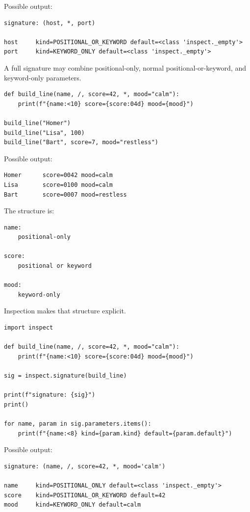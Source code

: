 Possible output:

\begin{verbatim}
signature: (host, *, port)

host     kind=POSITIONAL_OR_KEYWORD default=<class 'inspect._empty'>
port     kind=KEYWORD_ONLY default=<class 'inspect._empty'>
\end{verbatim}

A full signature may combine positional-only, normal positional-or-keyword, and keyword-only parameters.

\begin{verbatim}
def build_line(name, /, score=42, *, mood="calm"):
    print(f"{name:<10} score={score:04d} mood={mood}")

build_line("Homer")
build_line("Lisa", 100)
build_line("Bart", score=7, mood="restless")
\end{verbatim}

Possible output:

\begin{verbatim}
Homer      score=0042 mood=calm
Lisa       score=0100 mood=calm
Bart       score=0007 mood=restless
\end{verbatim}

The structure is:

\begin{verbatim}
name:
    positional-only

score:
    positional or keyword

mood:
    keyword-only
\end{verbatim}

Inspection makes that structure explicit.

\begin{verbatim}
import inspect

def build_line(name, /, score=42, *, mood="calm"):
    print(f"{name:<10} score={score:04d} mood={mood}")

sig = inspect.signature(build_line)

print(f"signature: {sig}")
print()

for name, param in sig.parameters.items():
    print(f"{name:<8} kind={param.kind} default={param.default}")
\end{verbatim}

Possible output:

\begin{verbatim}
signature: (name, /, score=42, *, mood='calm')

name     kind=POSITIONAL_ONLY default=<class 'inspect._empty'>
score    kind=POSITIONAL_OR_KEYWORD default=42
mood     kind=KEYWORD_ONLY default=calm
\end{verbatim}

